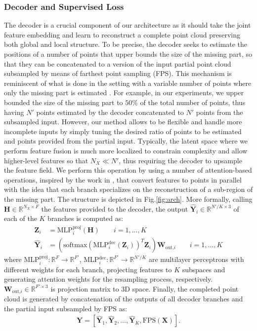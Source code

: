 \documentclass{article}
\newcommand{\Hb}{\mathbf{H}}
\newcommand{\Wb}{\mathbf{W}}
\newcommand{\Xb}{\mathbf{X}}
\newcommand{\Yb}{\mathbf{Y}}
\newcommand{\Zb}{\mathbf{Z}}
\begin{document}
\subsubsection{Decoder and Supervised Loss}
The decoder is a crucial component of our architecture as it should take the joint feature embedding and learn to reconstruct a complete point cloud preserving both global and local structure. To be precise, the decoder seeks to estimate the positions of a number of points that upper bounds the size of the missing part, so that they can be concatenated to a version of the input partial point cloud subsampled by means of farthest point sampling (FPS). This mechanism is reminiscent of what is done in the setting with a variable number of points where only the missing part is estimated \cite{huang2020pf,alliegro2021denoise}. For example, in our experiments, we upper bounded the size of the missing part to $50\%$ of the total number of points, thus having $N'$ points estimated by the decoder concatenated to $N'$ points from the subsampled input. However, our method allows to be flexible and handle more incomplete inputs by simply tuning the desired ratio of points to be estimated and points provided from the partial input.
Typically, the latent space where we perform feature fusion is much more localized to constrain complexity and allow higher-level features so that $N_X \ll N'$, thus requiring the decoder to upsample the feature field. We perform this operation by using a number of attention-based operations, inspired by the work in \cite{axform}, that convert features to points in parallel with the idea that each branch specializes on the reconstruction of a sub-region of the missing part. The structure is depicted in Fig.\ref{fig:arch}. More formally, calling $\Hb \in \mathbb{R}^{N_X \times F}$ the features provided to the decoder, the output $\hat{\Yb}_i \in \mathbb{R}^{N'/K \times 3}$ of each of the $K$ branches is computed as:
\begin{align}
    \Zb_i &= \text{MLP}_i^{\text{proj}}(\Hb) \qquad i=1,\dots,K\\
    \hat{\Yb}_i &= \left( \text{softmax}( \text{MLP}_i^{\text{dec}}(\Zb_i) )^T \Zb_i \right) \Wb_{\text{out,}i} \qquad i=1,\dots,K
\end{align}
where MLP$_i^\text{proj} : \mathbb{R}^{F} \rightarrow \mathbb{R}^{F'}$, MLP$_i^\text{dec} : \mathbb{R}^{F'} \rightarrow \mathbb{R}^{N'/K}$ are multilayer perceptrons with different weights for each branch, projecting features to $K$ subspaces and generating attention weights for the resampling process, respectively. $\Wb_{\text{out,}i} \in \mathbb{R}^{F'\times 3}$ is projection matrix to 3D space.
Finally, the completed point cloud is generated by concatenation of the outputs of all decoder branches and the partial input subsampled by FPS as:
\begin{align}
    \hat{\Yb} = \left[ \hat{\Yb}_1, \hat{\Yb}_2, \dots, \hat{\Yb}_K, \text{FPS}(\Xb) \right].
\end{align}
\end{document}
